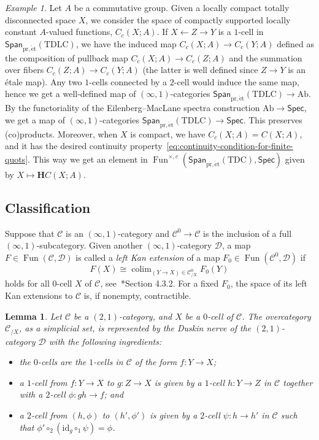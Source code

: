 \documentclass[a4paper,reqno]{amsart}
\theoremstyle{plain}
\newtheorem{lemma}[theorem]{Lemma}
\theoremstyle{definition}
\theoremstyle{remark}
\newtheorem{example}[theorem]{Example}
\numberwithin{equation}{section}
\newcommand{\cC}{\mathcal{C}}
\newcommand{\cD}{\mathcal{D}}
\newcommand{\bH}{\mathbf{H}}
\newcommand{\Ab}{\mathrm{Ab}}
\newcommand{\Spec}{\mathsf{Spec}}
\newcommand{\Span}{\mathsf{Span}}
\newcommand{\id}{\mathrm{id}}
\newcommand{\pret}{\mathrm{pr,\acute{e}t}}
\newcommand{\TDLC}{\mathrm{TDLC}}
\newcommand{\TDC}{\mathrm{TDC}}
\DeclareMathOperator{\Fun}{Fun}
\DeclareMathOperator*{\colim}{colim}
\begin{document}
\begin{example}\label{ex:transfer-EM-funcs}
Let $A$ be a commutative group.
Given a locally compact totally disconnected space $X$, we consider the space of compactly supported locally constant $A$-valued functions, $C_c(X; A)$.
If $X \leftarrow Z \to Y$ is a $1$-cell in $\Span_{\pret}(\TDLC)$, we have the induced map $C_c(X; A) \to C_c(Y; A)$ defined as the composition of pullback map $C_c(X; A) \to C_c(Z; A)$ and the summation over fibers $C_c(Z; A) \to C_c(Y; A)$ (the latter is well defined since $Z \to Y$ is an étale map).
Any two $1$-cells connected by a $2$-cell would induce the same map, hence we get a well-defined map of $(\infty, 1)$-categories $\Span_{\pret}(\TDLC) \to \Ab$.
By the functoriality of the Eilenberg--MacLane spectra construction $\Ab \to \Spec$, we get a map of $(\infty, 1)$-categories $\Span_{\pret}(\TDLC) \to \Spec$.
This preserves (co)products.
Moreover, when $X$ is compact, we have $C_c(X; A) = C(X; A)$, and it has the desired continuity property~\eqref{eq:continuity-condition-for-finite-quots}.
This way we get an element in $\Fun^{\times,c}(\Span_{\pret}(\TDC), \Spec)$ given by $X \mapsto \bH C(X; A)$.
\end{example}

\subsection{Classification}%

Suppose that $\cC$ is an $(\infty, 1)$-category and $\cC^0 \to \cC$ is the inclusion of a full $(\infty, 1)$-subcategory.
Given another $(\infty, 1)$-category $\cD$, a map $F \in \Fun(\cC, \cD)$ is called a \emph{left Kan extension} of a map $F_0 \in \Fun(\cC^0, \cD)$ if
\[
F(X) \cong \colim_{(Y \to X) \in \cC^0_{/X}} F_0(Y)
\]
holds for all $0$-cell $X$ of $\cC$, see~\cite{lur:ht}*{Section 4.3.2}.
For a fixed $F_0$, the space of its left Kan extensions to $\cC$ is, if nonempty, contractible.

\begin{lemma}\label{lem:overcat-of-2-1-cat}
Let $\cC$ be a $(2, 1)$-category, and $X$ be a $0$-cell of $\cC$.
The overcategory $\cC_{/X}$, as a simplicial set, is represented by the Duskin nerve of the $(2, 1)$-category $\cD$ with the following ingredients:
\begin{itemize}
\item the $0$-cells are the $1$-cells in $\cC$ of the form $f\colon Y \to X$;
\item a $1$-cell from $f \colon Y \to X$ to $g \colon Z \to X$ is given by a $1$-cell $h \colon Y \to Z$ in $\cC$ together with a $2$-cell $\phi \colon g h \to f$; and
\item a $2$-cell from $(h, \phi)$ to $(h', \phi')$ is given by a $2$-cell $\psi \colon h \to h'$ in $\cC$ such that $\phi' \circ_2 (\id_g \circ_1 \psi) = \phi$.
\end{itemize}
\end{lemma}
\end{document}
